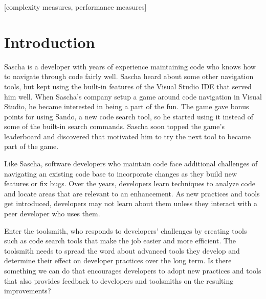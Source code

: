 \documentclass{sig-alternate}
\begin{document}
[complexity measures, performance measures]



\section{Introduction}

Sascha is a developer with years of experience maintaining code who knows how to navigate through code fairly well.  Sascha heard about some other navigation tools, but kept using the built-in features of the Visual Studio IDE that served him well.  When Sascha's company setup a game around code navigation in Visual Studio, he became interested in being a part of the fun.  The game gave bonus points for using Sando, a new code search tool, so he started using it instead of some of the built-in search commands.  Sascha soon topped the game's leaderboard and discovered that motivated him to try the next tool to became part of the game. 

Like Sascha, software developers who maintain code face additional challenges of navigating an existing code base to incorporate changes as they build new features or fix bugs.  Over the years, developers learn techniques to analyze code and locate areas that are relevant to an enhancement.  As new practices and tools get introduced, developers may not learn about them unless they interact with a peer developer who uses them\cite{wbsnipes:Hill2011Peer}.    

Enter the toolsmith,  who responds to developers' challenges by creating tools such as code search tools that make the job easier and more efficient.  The toolsmith needs to spread the word about advanced tools they develop and determine their effect on developer practices over the long term.  Is there something we can do that encourages developers to adopt new practices and tools that also provides feedback to developers and toolsmiths on the resulting improvements?  
\end{document}
